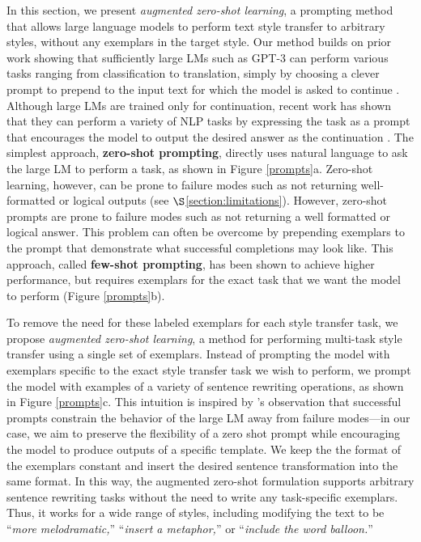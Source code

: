 In this section, we present \textit{augmented zero-shot learning}, a prompting method that allows large language models to perform text style transfer to arbitrary styles, without any exemplars in the target style.
Our method builds on prior work showing that sufficiently large LMs such as GPT-3 can perform various tasks ranging from classification to translation, simply by choosing a clever prompt to prepend to the input text for which the model is asked to continue \citep{DBLP:journals/corr/abs-2005-14165,branwen2020gpt}. 
Although large LMs are trained only for continuation, recent work has shown that they can perform a variety of NLP tasks by expressing the task as a prompt that encourages the model to output the desired answer as the continuation \citep{liu2021pre,puri2019zero,weller-etal-2020-learning,DBLP:journals/corr/abs-2005-14165,schick-schutze-2021-just}. 
The simplest approach, \textbf{zero-shot prompting}, directly uses natural language to ask the large LM to perform a task, as shown in Figure \ref{prompts}a. Zero-shot learning, however, can be prone to failure modes such as not returning well-formatted or logical outputs (see $\S$\ref{section:limitations}).
 However, zero-shot prompts are prone to failure modes such as not returning a well formatted or logical answer.
This problem can often be overcome by prepending exemplars to the prompt that demonstrate what successful completions may look like.
This approach, called \textbf{few-shot prompting}, has been shown to achieve higher performance, but requires exemplars for the exact task that we want the model to perform (Figure \ref{prompts}b).

To remove the need for these labeled exemplars for each style transfer task, we propose \textit{augmented zero-shot learning}, a method for performing multi-task style transfer using a single set of exemplars.
Instead of prompting the model with exemplars specific to the exact style transfer task we wish to perform, we prompt the model with examples of a variety of sentence rewriting operations, as shown in Figure \ref{prompts}c. 
This intuition is inspired by \citet{reynolds2021prompt}'s observation that successful prompts constrain the behavior of the large LM away from failure modes---in our case, we aim to preserve the flexibility of a zero shot prompt while encouraging the model to produce outputs of a specific template.
We keep the the format of the exemplars constant and insert the desired sentence transformation into the same format.
In this way, the augmented zero-shot formulation supports arbitrary sentence rewriting tasks without the need to write any task-specific exemplars.
Thus, it works for a wide range of styles, including modifying the text to be ``\textit{more melodramatic,}'' ``\textit{insert a metaphor,}'' or ``\textit{include the word balloon.}''

